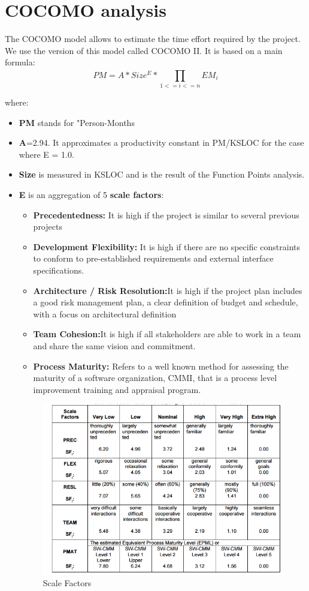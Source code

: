 \section{COCOMO analysis}
The COCOMO model allows to estimate the time effort required by the project. We use the version of this model called COCOMO II. It is based on a main formula:
\begin{equation}
PM = A * Size^{E} * \prod_{1<=i<=n}^{} EM_{i} 
\end{equation}

where:
\begin{itemize}
\item \textbf{PM} stands for "Person-Months
\item \textbf{A}=2.94. It approximates a productivity constant in PM/KSLOC for the case where E = 1.0.
\item \textbf{Size} is measured in KSLOC and is the result of the Function Points analysis.
\item \textbf{E} is an aggregation of 5 \textbf{scale factors}:
	\begin{itemize}[label = {-}]
	\item \textbf{Precedentedness:} It is high if the project is similar to several previous projects
	\item \textbf{Development Flexibility:} It is high if there are no specific constraints to conform to pre-established 		requirements and external interface specifications.
	\item \textbf{Architecture / Risk Resolution:}It is high if the project plan includes a good risk management plan, a clear definition of budget and schedule, with a focus on architectural definition
\item \textbf{Team Cohesion:}It is high if all stakeholders are able to work in a team and share the same vision and commitment.
\item \textbf{Process Maturity:} Refers to a well known method for assessing the maturity of a software organization, CMMI, that is a process level improvement training and appraisal program.
	\end{itemize}
\begin{figure}[H]	
	\centering
	\includegraphics[scale = 0.7]{img/scaleFactors.png}
	\caption{Scale Factors}
\end{figure}


\end{itemize}
